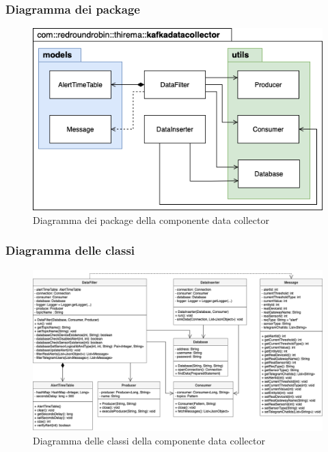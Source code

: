 	\subsubsection{Diagramma dei package}%
	\begin{figure}[H]
			\centering
			\includegraphics[scale=0.600]{res/images/DATACOLLECTOR/Packagekafkadatacollector.png}
			\caption{Diagramma dei package della componente data collector}
			\label{Diagramma 5}
		\end{figure}
	\begin{landscape}
	\subsubsection{Diagramma delle classi}%
		\begin{figure}[H]
			\centering
			\includegraphics[scale=0.550]{res/images/DATACOLLECTOR/ClassikafkaDataCollector.png}
			\caption{Diagramma delle classi della componente data collector}
			\label{Diagramma 6}
		\end{figure}
	\end{landscape}
